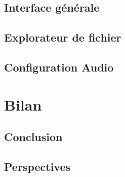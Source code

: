 \documentclass[12pt]{report}
\begin{document}
\section{Interface générale}


\section{Explorateur de fichier}
\section{Configuration Audio}

\chapter{Bilan}
\section{Conclusion}
\section{Perspectives} %
\end{document}
